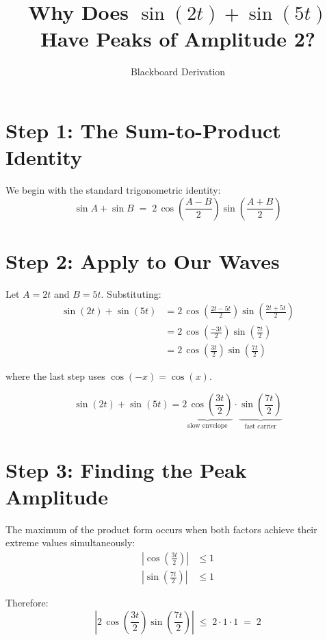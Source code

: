 \documentclass[12pt]{article}
\title{\textbf{Why Does $\sin(2t) + \sin(5t)$ Have Peaks of Amplitude 2?}}
\author{Blackboard Derivation}
\date{}
\begin{document}
\maketitle

\section*{Step 1: The Sum-to-Product Identity}

We begin with the standard trigonometric identity:
\[
\boxed{\sin A + \sin B \;=\; 2\,\cos\!\left(\frac{A-B}{2}\right)\sin\!\left(\frac{A+B}{2}\right)}
\]

\section*{Step 2: Apply to Our Waves}

Let $A = 2t$ and $B = 5t$. Substituting:
\begin{align*}
\sin(2t) + \sin(5t)
&= 2\,\cos\!\left(\frac{2t - 5t}{2}\right)\sin\!\left(\frac{2t + 5t}{2}\right) \\[8pt]
&= 2\,\cos\!\left(\frac{-3t}{2}\right)\sin\!\left(\frac{7t}{2}\right) \\[8pt]
&= 2\,\cos\!\left(\frac{3t}{2}\right)\sin\!\left(\frac{7t}{2}\right)
\end{align*}

where the last step uses $\cos(-x) = \cos(x)$.

\begin{tcolorbox}[colback=blue!5, colframe=blue!50!black, title=Decomposition]
\[
\sin(2t) + \sin(5t) = \underbrace{2\,\cos\!\left(\frac{3t}{2}\right)}_{\text{slow envelope}} \cdot \underbrace{\sin\!\left(\frac{7t}{2}\right)}_{\text{fast carrier}}
\]
\end{tcolorbox}

\section*{Step 3: Finding the Peak Amplitude}

The maximum of the product form occurs when both factors achieve their extreme values simultaneously:
\begin{align*}
\left|\cos\!\left(\frac{3t}{2}\right)\right| &\leq 1 \\[4pt]
\left|\sin\!\left(\frac{7t}{2}\right)\right| &\leq 1
\end{align*}

Therefore:
\[
\left|2\,\cos\!\left(\frac{3t}{2}\right)\sin\!\left(\frac{7t}{2}\right)\right| \;\leq\; 2 \cdot 1 \cdot 1 \;=\; 2
\]
\end{document}
